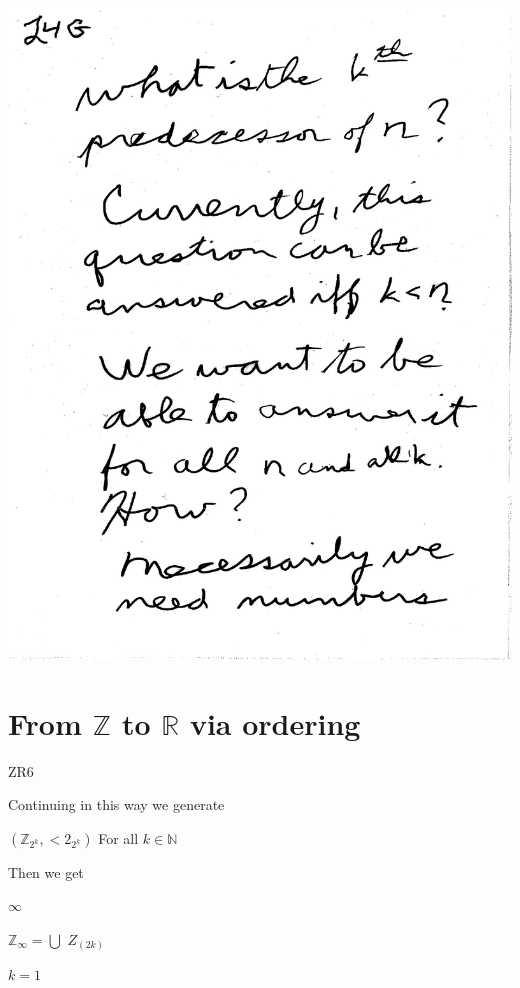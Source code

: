 \documentclass[10pt,a4paper]{article}
\begin{document}
{{\includegraphics[scale=0.5]{Pages/generateN7.pdf}

\newpage



\section{From $\mathbb{Z}$ to $\mathbb{R}$ via ordering}


ZR6

 
Continuing in this way we generate 

$(\mathbb{Z}_{2^k},<2_{2^k})$ For all $k\in\mathbb{N}$
                     


Then we get 

\quad\quad\quad$\infty$
           
$\mathbb{Z}_{\infty} = \bigcup$ $Z_{(2k)}$ 

  \quad\quad $k=1$

}}
\end{document}
